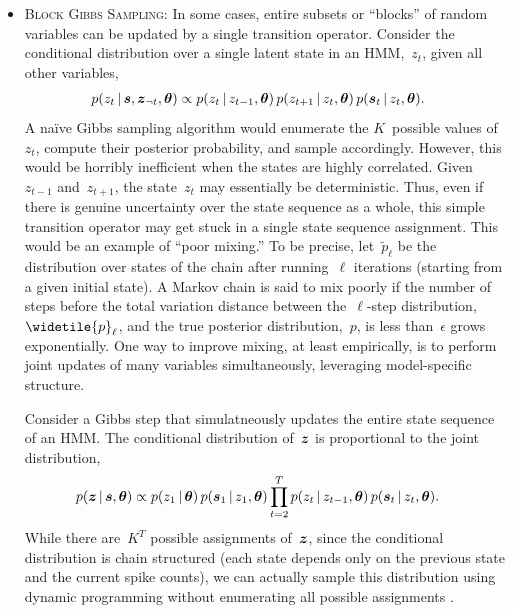 \begin{itemize}
\item \textsc{Block Gibbs Sampling}:
  In some cases, entire subsets or ``blocks'' of random variables can 
  be updated by a single transition operator. Consider the conditional
  distribution over a single latent state in an HMM,~$z_t$, given all other
  variables,  
  \begin{align*}
    p(z_t \,|\, \boldsymbol{s}, \boldsymbol{z}_{\neg t}, \boldsymbol{\theta}) 
    &\propto p(z_t \,|\, z_{t-1}, \boldsymbol{\theta}) \,
    p(z_{t+1} \,|\, z_t, \boldsymbol{\theta}) \,
    p(\boldsymbol{s}_t \,|\, z_t, \boldsymbol{\theta}).
  \end{align*}
  A na\"ive Gibbs sampling algorithm would enumerate the $K$~possible
  values of~$z_t$, compute their posterior probability, and sample
  accordingly. However, this would be horribly inefficient when the
  states are highly correlated. Given~$z_{t-1}$ and~$z_{t+1}$, the
  state~$z_t$ may essentially be deterministic. Thus, even if there is
  genuine uncertainty over the state sequence as a whole, this simple
  transition operator may get stuck in a single state sequence
  assignment.  This would be an example of ``poor mixing.'' To be
  precise, let~$\widetilde{p}_\ell$ be the distribution over states of
  the chain after running~$\ell$ iterations (starting from a given
  initial state).  A Markov chain is said to mix poorly if the number
  of steps before the total variation distance between
  the~$\ell$-step distribution,~$\widetile{p}_\ell$, and the true
  posterior distribution,~$p$, is less than~$\epsilon$ grows exponentially.
  One way to improve mixing, at least empirically, is to perform 
  joint updates of many variables simultaneously, leveraging model-specific
  structure.

  Consider a Gibbs step that simulatneously updates the entire
  state sequence of an HMM.  The conditional distribution of~$\boldsymbol{z}$ is
  proportional to the joint distribution,
  \begin{align*}
    p(\boldsymbol{z} \,|\, \boldsymbol{s}, \boldsymbol{\theta}) 
    &\propto p(z_1 \,|\, \boldsymbol{\theta}) \, p(\boldsymbol{s}_1 \,|\, z_1, \boldsymbol{\theta})
      \prod_{t=2}^T p(z_t \,|\, z_{t-1}, \boldsymbol{\theta}) \, 
      p(\boldsymbol{s}_t \,|\, z_t, \boldsymbol{\theta}).
  \end{align*}
  While there are~$K^T$ possible assignments of~$\boldsymbol{z}$, since the
  conditional distribution is chain structured (each state depends
  only on the previous state and the current spike counts), we can
  actually sample this distribution using dynamic programming
  without enumerating all possible assignments \citep[e.g.][]{bishop2006pattern}.
  

\end{itemize}
